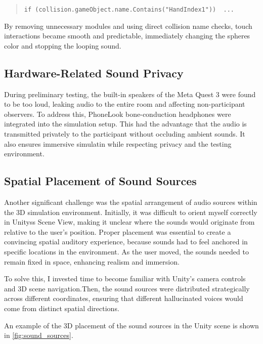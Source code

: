\begin{quote} \small \texttt{if (collision.gameObject.name.Contains("HandIndex1")) { ... }} \end{quote}

By removing unnecessary modules and using direct collision name checks, touch interactions became smooth and predictable, immediately changing the spheres color and stopping the looping sound.

\subsection{Hardware-Related Sound Privacy} During preliminary testing, the built-in speakers of the Meta Quest 3 were found to be too loud, leaking audio to the entire room and affecting non-participant observers. To address this, PhoneLook bone-conduction headphones were integrated into the simulation setup. This had the advantage that the audio is transmitted privately to the participant without occluding ambient sounds.
It also ensures immersive simulatin while respecting privacy and the testing environment.

\subsection{Spatial Placement of Sound Sources} Another significant challenge was the spatial arrangement of audio sources within the 3D simulation environment. Initially, it was difficult to orient myself correctly in Unityss Scene View, making it unclear where the sounds would originate from relative to the user's position. Proper placement was essential to create a convincing spatial auditory experience, because sounds had to feel anchored in specific locations in the environment. As the user moved, the sounds needed to remain fixed in space, enhancing realism and immersion.

To solve this, I invested time to become familiar with Unity's camera controls and 3D scene navigation.Then, the sound sources were distributed strategically across different coordinates, ensuring that different hallucinated voices would come from distinct spatial directions.

An example of the 3D placement of the sound sources in the Unity scene is shown in \autoref{fig:sound_sources}.

